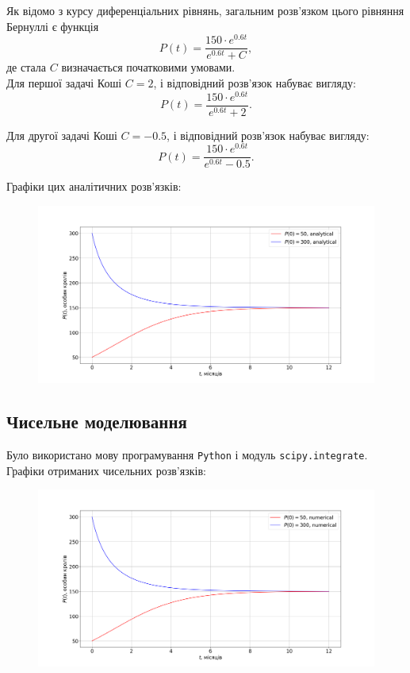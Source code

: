Як відомо з курсу диференціальних рівнянь, загальним розв'язком цього рівняння Бернуллі є функція
\begin{equation*}
	P(t) = \frac{150 \cdot e^{0.6 t}}{e^{0.6 t} + C},
\end{equation*}
де стала $C$ визначається початковими умовами. \\

Для першої задачі Коші $C = 2$, і відповідний розв'язок набуває вигляду:
\begin{equation*}
	P(t) = \frac{150 \cdot e^{0.6 t}}{e^{0.6 t} + 2}.
\end{equation*}

Для другої задачі Коші $C = - 0.5$, і відповідний розв'язок набуває вигляду:
\begin{equation*}
	P(t) = \frac{150 \cdot e^{0.6 t}}{e^{0.6 t} - 0.5}.
\end{equation*}

Графіки цих аналітичних розв'язків:
\begin{figure}[H]
	\centering
	\includegraphics[width=\textwidth]{1_analytical.png}
\end{figure}

\subsection{Чисельне моделювання}

Було використано мову програмування \texttt{Python} і модуль \texttt{scipy.integrate}. \\

Графіки отриманих чисельних розв'язків:
\begin{figure}[H]
	\centering
	\includegraphics[width=\textwidth]{1_numerical.png}
\end{figure}

